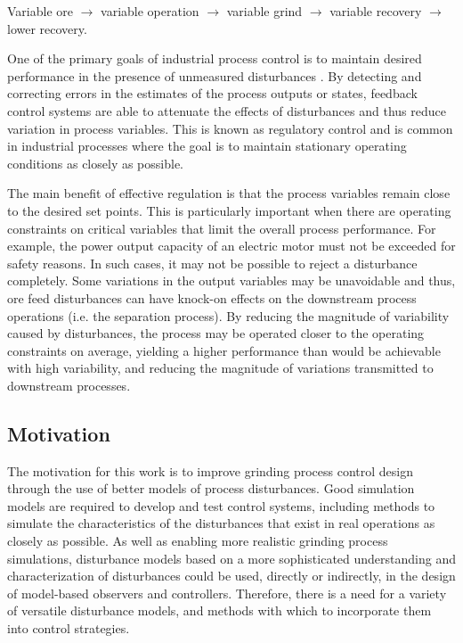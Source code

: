 Variable ore $\to$ variable operation $\to$ variable grind $\to$ variable recovery $\to$ lower recovery. 

One of the primary goals of industrial process control is to maintain desired performance in the presence of unmeasured disturbances \citep{astrom_computer_1997}. By detecting and correcting errors in the estimates of the process outputs or states, feedback control systems are able to attenuate the effects of disturbances and thus reduce variation in process variables. This is known as regulatory control and is common in industrial processes where the goal is to maintain stationary operating conditions as closely as possible.

The main benefit of effective regulation is that the process variables remain close to the desired set points. This is particularly important when there are operating constraints on critical variables that limit the overall process performance. For example, the power output capacity of an electric motor must not be exceeded for safety reasons. In such cases, it may not be possible to reject a disturbance completely. Some variations in the output variables may be unavoidable and thus, ore feed disturbances can have knock-on effects on the downstream process operations (i.e. the separation process). By reducing the magnitude of variability caused by disturbances, the process may be operated closer to the operating constraints on average, yielding a higher performance than would be achievable with high variability, and reducing the magnitude of variations transmitted to downstream processes.

\subsection*{Motivation}

The motivation for this work is to improve grinding process control design through the use of better models of process disturbances. Good simulation models are required to develop and test control systems, including methods to simulate the characteristics of the disturbances that exist in real operations as closely as possible. As well as enabling more realistic grinding process simulations, disturbance models based on a more sophisticated understanding and characterization of disturbances could be used, directly or indirectly, in the design of model-based observers and controllers. Therefore, there is a need for a variety of versatile disturbance models, and methods with which to incorporate them into control strategies.

